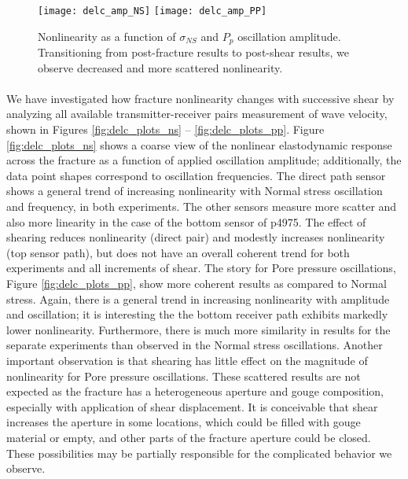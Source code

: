 \clearpage

\begin{figure}[ht]
	\centering
	\texttt{[image: delc\_amp\_NS]}
	\texttt{[image: delc\_amp\_PP]}
	\caption{Nonlinearity as a function of $ \sigma_{NS} $ and $ P_p $ oscillation amplitude. Transitioning from post-fracture results to post-shear results, we observe decreased and more scattered nonlinearity.}%
	\label{fig:delc_ns_amp}
\end{figure}

\clearpage


\paragraph{}
We have investigated how fracture nonlinearity changes with successive shear by analyzing all available transmitter-receiver pairs measurement of wave velocity, shown in Figures \ref{fig:delc_plots_ns} -- \ref{fig:delc_plots_pp}. Figure \ref{fig:delc_plots_ns} shows a coarse view of the nonlinear elastodynamic response across the fracture as a function of applied oscillation amplitude; additionally, the data point shapes correspond to oscillation frequencies. The direct path sensor shows a general trend of increasing nonlinearity with Normal stress oscillation and frequency, in both experiments. The other sensors measure more scatter and also more linearity in the case of the bottom sensor of p4975. The effect of shearing reduces nonlinearity (direct pair) and modestly increases nonlinearity (top sensor path), but does not have an overall coherent trend for both experiments and all increments of shear. 
The story for Pore pressure oscillations, Figure \ref{fig:delc_plots_pp}, show more coherent results as compared to Normal stress. Again, there is a general trend in increasing nonlinearity with amplitude and oscillation; it is interesting the the bottom receiver path exhibits markedly lower nonlinearity. Furthermore, there is much more similarity in results for the separate experiments than observed in the Normal stress oscillations. Another important observation is that shearing has little effect on the magnitude of nonlinearity for Pore pressure oscillations. 
These scattered results are not expected as the fracture has a heterogeneous aperture and gouge composition, especially with application of shear displacement. It is conceivable that shear increases the aperture in some locations, which could be filled with gouge material or empty, and other parts of the fracture aperture could be closed. These possibilities may be partially responsible for the complicated behavior we observe. 

